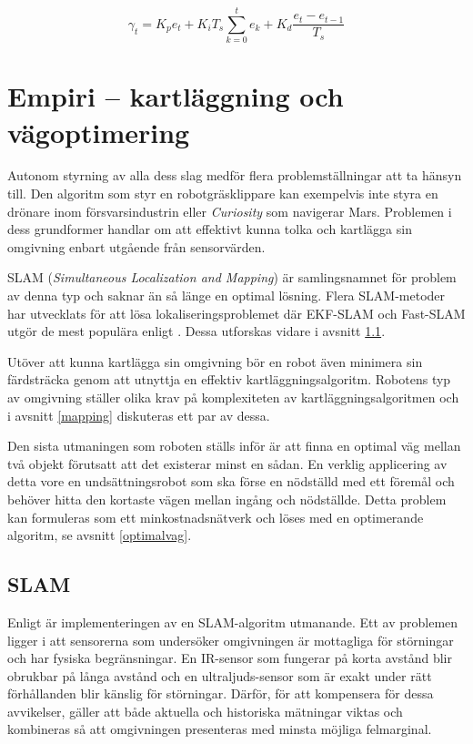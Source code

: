 \documentclass[11pt]{article}
\begin{document}
\begin{flushleft}
\begin{equation}
	\gamma_t = K_p e_t + K_i T_s \displaystyle\sum_{k=0}^{t} e_k + K_d \frac {e_t - e_{t-1}}{T_s}
\end{equation}

\pagebreak
\section{Empiri -- kartläggning och vägoptimering}
Autonom styrning av alla dess slag medför flera problemställningar att ta hänsyn till. Den algoritm som styr en robotgräsklippare kan exempelvis inte styra en drönare inom försvarsindustrin eller \emph{Curiosity} som navigerar Mars. Problemen i dess grundformer handlar om att effektivt kunna tolka och kartlägga sin omgivning enbart utgående från sensorvärden.

SLAM (\emph{Simultaneous Localization and Mapping}) är samlingsnamnet för problem av denna typ och saknar än så länge en optimal lösning. Flera SLAM-metoder har utvecklats för att lösa lokaliseringsproblemet där EKF-SLAM och Fast-SLAM utgör de mest populära enligt \cite{rat}. Dessa utforskas vidare i avsnitt \ref{slam}.

Utöver att kunna kartlägga sin omgivning bör en robot även minimera sin färdsträcka genom att utnyttja en effektiv kartläggningsalgoritm. Robotens typ av omgivning ställer olika krav på komplexiteten av kartläggningsalgoritmen och i avsnitt \ref{mapping} diskuteras ett par av dessa.

Den sista utmaningen som roboten ställs inför är att finna en optimal väg mellan två objekt förutsatt att det existerar minst en sådan. En verklig applicering av detta vore en undsättningsrobot som ska förse en nödställd med ett föremål och behöver hitta den kortaste vägen mellan ingång och nödställde. Detta problem kan formuleras som ett minkostnadsnätverk och löses med en optimerande algoritm, se avsnitt \ref{optimalvag}. 

\subsection{SLAM}
\label{slam}
Enligt \cite{ekf} är implementeringen av en SLAM-algoritm utmanande. Ett av problemen ligger i att sensorerna som undersöker omgivningen är mottagliga för störningar och har fysiska begränsningar. En IR-sensor som fungerar på korta avstånd blir obrukbar på långa avstånd och en ultraljuds-sensor som är exakt under rätt förhållanden blir känslig för störningar. Därför, för att kompensera för dessa avvikelser, gäller att både aktuella och historiska mätningar viktas och kombineras så att omgivningen presenteras med minsta möjliga felmarginal. 


\end{flushleft}
\end{document}

